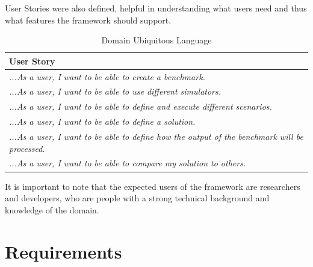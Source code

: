 \documentclass[12pt,a4paper,openright,twoside]{book}
\begin{document}
User Stories were also defined, helpful in understanding what users need and thus what features the framework should support.

\begin{table}[h]
  \centering
  \begin{tabular}{|p{}|}
    \toprule
    \textbf{User Story}                                                                                   \\
    \midrule
    \textit{...As a user, I want to be able to create a benchmark.}                                       \\ \hline
    \textit{...As a user, I want to be able to use different simulators.}                                 \\ \hline
    \textit{...As a user, I want to be able to define and execute different scenarios.}                   \\ \hline
    \textit{...As a user, I want to be able to define a solution.}                                        \\ \hline
    \textit{...As a user, I want to be able to define how the output of the benchmark will be processed.} \\ \hline
    \textit{...As a user, I want to be able to compare my solution to others.}                       \\ \hline
  \end{tabular}
  \caption{Domain Ubiquitous Language}
\end{table}

It is important to note that the expected users of the framework are researchers and developers,
who are people with a strong technical background and knowledge of the domain.

\section{Requirements}
\end{document}
